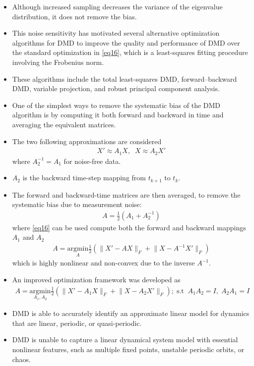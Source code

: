 \documentclass[hyperref={pdfpagemode=FullScreen},aspectratio=169]{beamer}
\begin{document}
\begin{frame}{}
\begin{itemize}
\setlength\itemsep{1em}
\item Although increased sampling decreases the variance of the eigenvalue distribution, it does not
remove the bias.
\item This noise sensitivity has motivated several alternative optimization algorithms for DMD to improve the quality and performance of DMD over the standard optimization in \cref{eq16}, which is a least-squares fitting procedure involving the Frobenius norm.
\item These algorithms include the total least-squares DMD, forward–backward DMD, variable projection, and robust principal component analysis.
\item One of the simplest ways to remove the systematic bias of the DMD algorithm is by computing it both forward and backward in time and averaging the equivalent matrices.
\item The two following approximations are considered
\begin{align}
X'\approx A_1X, \;\; X \approx A_2 X'
\end{align}
where $A_2^{-1} = A_1$ for noise-free data.
\item $A_2$ is the backward time-step mapping from $t_{k+1}$ to $t_k$.
\end{itemize}
\end{frame}
\begin{frame}{}
\begin{itemize}
\setlength\itemsep{1em}
\item The forward and backward-time matrices are then averaged, to remove the systematic bias due to measurement noise:
\begin{align}
A= \frac{1}{2}(A_1+A_2^{-1})
\end{align}
where \cref{eq16} can be used compute both the forward and backward mappings $A_1$ and $A_2$
\begin{align}
A = \underset{A}{\text{argmin}} \frac{1}{2}(\lVert X'-AX\rVert_F  + \lVert X-A^{-1}X'\rVert_F)
\end{align}
which is highly nonlinear and non-convex due to the inverse $A^{-1}$.
\item An improved optimization framework was developed as
\begin{align}
A = \underset{A_1,A_2}{\text{argmin}} \frac{1}{2}(\lVert X'-A_1X\rVert_F  + \lVert X-A_2X'\rVert_F); \; \text{s.t}\;\; A_1A_2 = I, \; A_2A_1=I
\end{align}
\item DMD is able to accurately identify an approximate linear model for dynamics that are linear, periodic, or quasi-periodic.
\item  DMD is unable to capture a linear dynamical system model with essential nonlinear features, such as multiple fixed points, unstable periodic orbits, or chaos.
\end{itemize}
\end{frame}
\end{document}
